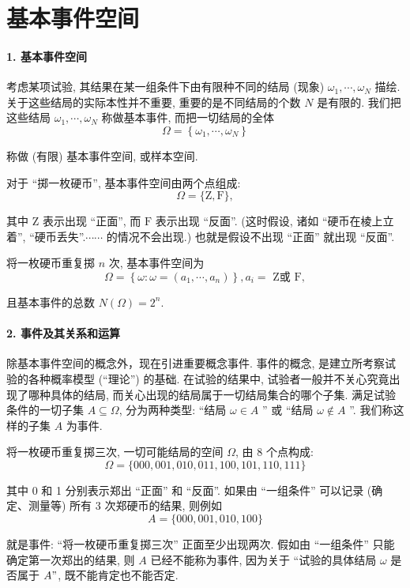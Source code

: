 \section{基本事件空间}
\paragraph{1. 基本事件空间}  考虑某项试验, 其结果在某一组条件下由有限种不同的结局 (现象) $\omega_1, \cdots, \omega_N$ 描绘. 关于这些结局的实际本性并不重要, 重要的是不同结局的个数 $N$ 是有限的. 我们把这些结局 $\omega_1, \cdots, \omega_N$ 称做基本事件, 而把一切结局的全体
$$
\Omega=\left\{\omega_1, \cdots, \omega_N\right\}
$$

称做 (有限) 基本事件空间, 或样本空间.

\begin{example}
    对于 “掷一枚硬币”, 基本事件空间由两个点组成:
$$
\Omega=\{\mathrm{Z}, \mathrm{F}\},
$$

其中 Z 表示出现 “正面”, 而 $\mathrm{F}$ 表示出现 “反面”. (这时假设, 诸如 “硬币在棱上立着”, “硬币丢失”.$\cdots \cdots$ 的情况不会出现.) 也就是假设不出现 “正面” 就出现 “反面”.

    将一枚硬币重复掷 $n$ 次, 基本事件空间为
$$
\Omega=\left\{\omega: \omega=\left(a_1, \cdots, a_n\right)\right\}, a_i=\text { Z或 } \mathrm{F},
$$

且基本事件的总数 $N(\Omega)=2^n$.
\end{example}

\paragraph{2. 事件及其关系和运算} 除基本事件空间的概念外，现在引进重要概念事件. 事件的概念, 是建立所考察试验的各种概率模型 (“理论”) 的基础. 在试验的结果中, 试验者一般并不关心究竟出现了哪种具体的结局, 而关心出现的结局属于一切结局集合的哪个子集. 满足试验条件的一切子集 $A \subseteq \Omega$, 分为两种类型: “结局 $\omega \in A$ ” 或 “结局 $\omega \notin A$ ”. 我们称这样的子集 $A$ 为事件.

\begin{example}
    将一枚硬币重复掷三次, 一切可能结局的空间 $\Omega$, 由 8 个点构成:
$$
\Omega=\{000,001,010,011,100,101,110,111\}
$$

其中 0 和 1 分别表示郑出 “正面” 和 “反面”. 如果由 “一组条件” 可以记录 (确定、测量等) 所有 3 次郑硬币的结果, 则例如
$$
A=\{000,001,010,100\}
$$

就是事件: “将一枚硬币重复掷三次” 正面至少出现两次. 假如由 “一组条件” 只能确定第一次郑出的结果, 则 $A$ 已经不能称为事件, 因为关于 “试验的具体结局 $\omega$ 是否属于 $A "$, 既不能肯定也不能否定.
\end{example}

